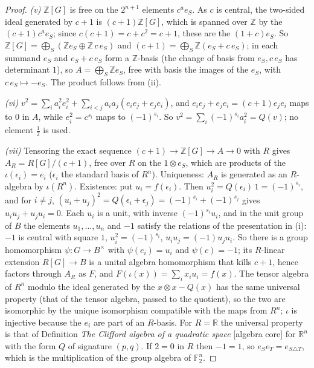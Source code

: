 \documentclass[11pt]{article}
\theoremstyle{definition}
\theoremstyle{plain}
\providecommand{\R}{}\renewcommand{\R}{\mathbb{R}}
\providecommand{\Z}{}\renewcommand{\Z}{\mathbb{Z}}
\begin{document}
\begin{proof}
\emph{(v)} $\Z[G]$ is free on the $2^{n+1}$ elements $c^{a}e_{S}$. As $c$ is central, the two-sided ideal generated by $c + 1$ is $(c + 1)\Z[G]$, which is spanned over $\Z$ by the $(c + 1)c^{a}e_{S}$; since $c(c + 1) = c + c^{2} = c + 1$, these are the $(1 + c)e_{S}$. So $\Z[G] = \bigoplus_{S}(\Z e_{S} \oplus \Z\,c\,e_{S})$ and $(c + 1) = \bigoplus_{S}\Z(e_{S} + c\,e_{S})$; in each summand $e_{S}$ and $e_{S} + c\,e_{S}$ form a $\Z$-basis (the change of basis from $e_{S}, c\,e_{S}$ has determinant $1$), so $A = \bigoplus_{S}\Z e_{S}$, free with basis the images of the $e_{S}$, with $c\,e_{S} \mapsto -e_{S}$. The product follows from (ii).

\emph{(vi)} $v^{2} = \sum_{i}a_{i}^{2}e_{i}^{2} + \sum_{i < j}a_{i}a_{j}(e_{i}e_{j} + e_{j}e_{i})$, and $e_{i}e_{j} + e_{j}e_{i} = (c + 1)e_{j}e_{i}$ maps to $0$ in $A$, while $e_{i}^{2} = c^{s_{i}}$ maps to $(-1)^{s_{i}}$. So $v^{2} = \sum_{i}(-1)^{s_{i}}a_{i}^{2} = Q(v)$; no element $\tfrac12$ is used.

\emph{(vii)} Tensoring the exact sequence $(c + 1) \to \Z[G] \to A \to 0$ with $R$ gives $A_{R} = R[G]/(c + 1)$, free over $R$ on the $1 \otimes e_{S}$, which are products of the $\iota(\epsilon_{i}) = e_{i}$ ($\epsilon_{i}$ the standard basis of $R^{n}$). Uniqueness: $A_{R}$ is generated as an $R$-algebra by $\iota(R^{n})$. Existence: put $u_{i} = f(\epsilon_{i})$. Then $u_{i}^{2} = Q(\epsilon_{i})\,1 = (-1)^{s_{i}}$, and for $i \ne j$, $(u_{i} + u_{j})^{2} = Q(\epsilon_{i} + \epsilon_{j}) = (-1)^{s_{i}} + (-1)^{s_{j}}$ gives $u_{i}u_{j} + u_{j}u_{i} = 0$. Each $u_{i}$ is a unit, with inverse $(-1)^{s_{i}}u_{i}$, and in the unit group of $B$ the elements $u_{1}, \dots, u_{n}$ and $-1$ satisfy the relations of the presentation in (i): $-1$ is central with square $1$, $u_{i}^{2} = (-1)^{s_{i}}$, $u_{i}u_{j} = (-1)u_{j}u_{i}$. So there is a group homomorphism $\psi : G \to B^{\times}$ with $\psi(e_{i}) = u_{i}$ and $\psi(c) = -1$; its $R$-linear extension $R[G] \to B$ is a unital algebra homomorphism that kills $c + 1$, hence factors through $A_{R}$ as $F$, and $F(\iota(x)) = \sum_{i}x_{i}u_{i} = f(x)$. The tensor algebra of $R^{n}$ modulo the ideal generated by the $x \otimes x - Q(x)$ has the same universal property (that of the tensor algebra, passed to the quotient), so the two are isomorphic by the unique isomorphism compatible with the maps from $R^{n}$; $\iota$ is injective because the $e_{i}$ are part of an $R$-basis. For $R = \R$ the universal property is that of Definition \emph{The Clifford algebra of a quadratic space} [algebra core] for $\R^{n}$ with the form $Q$ of signature $(p, q)$. If $2 = 0$ in $R$ then $-1 = 1$, so $e_{S}e_{T} = e_{S \triangle T}$, which is the multiplication of the group algebra of $\mathbb{F}_{2}^{n}$.


\end{proof}
\end{document}
